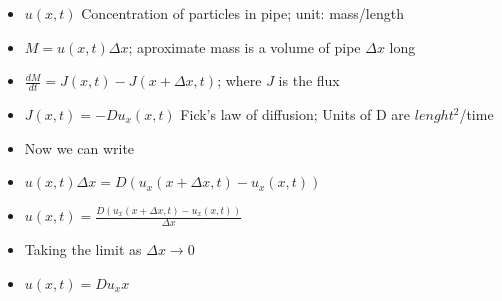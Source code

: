 \documentclass{beamer}
\begin{document}
\begin{frame}{}
    \begin{center}
    \begin{itemize}
        \item $u(x,t)$ Concentration of particles in pipe; unit: mass/length
        \item $M = u(x,t) \Delta x$; aproximate mass is a volume of pipe $\Delta x$ long
        \item $\frac{dM}{dt} = J(x,t) - J(x+\Delta x, t)$; where $J$ is the flux
        \item $J(x,t) = -D u_x(x,t)$ Fick's law of diffusion; Units of D are $lenght^2$/time
        \item Now we can write
        \item $u(x,t) \Delta x = D(u_x(x+ \Delta x,t) - u_x(x,t))$
        \item $u(x,t) = \frac{D(u_x(x+ \Delta x,t) - u_x(x,t))}{\Delta x}$
        \item Taking the limit as $\Delta x \to 0$
        \item $u(x,t) = Du_xx$
    \end{itemize}
    \end{center}
\end{frame}
\end{document}
